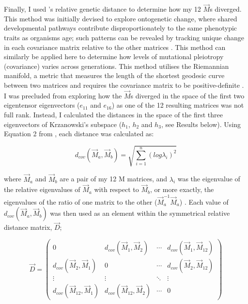 Finally, I used \citet{Mitt09}'s relative genetic distance to determine how my 12 $\vec{M}$s diverged. This method was initially devised to explore ontogenetic change, where shared developmental pathways contribute disproportionately to the same phenotypic traits as organisms age; such patterns can be revealed by tracking unique change in each covariance matrix relative to the other matrices \citep{Mitt09, Book14}. This method can similarly be applied here to determine how levels of mutational pleiotropy (covariance) varies across generations. This method utilises the Riemannian manifold, a metric that measures the length of the shortest geodesic curve between two matrices and requires the covariance matrix to be positive-definite \citep{Mitt09}. I was precluded from exploring how the $\vec{M}$s diverged in the space of the first two eigentensor eigenvectors ($e_{11}$ and $e_{16}$) as one of the 12 resulting matrices was not full rank. Instead, I calculated the distances in the space of the first three eigenvectors of Krzanowski’s subspace ($h_1$, $h_2$ and $h_3$, see Results below). Using Equation 2 from \citet{Mitt09}, each distance was calculated as:\par

\vspace{-\parskip}
\begin{equation}
d_{cov}(\vec{M}_a, \vec{M}_b) = \sqrt{ \sum_{i=1}^{n}(log \lambda_{i})^{2}}  \label{eqn:multi_5_mitte}
\end{equation}

\noindent where $\vec{M}_a$ and $\vec{M}_b$ are a pair of my 12 M matrices, and $\lambda_i$ was the eigenvalue of the relative eigenvalues of $\vec{M}_a$ with respect to $\vec{M}_b$, or more exactly, the eigenvalues of the ratio of one matrix to the other ($\vec{M}_a^{-1}\vec{M}_a$) \citep{Mitt09}. Each value of $d_{cov}(\vec{M}_a, \vec{M}_b)$ was then used as an element within the symmetrical relative distance matrix, $\vec{D}$;\par

\begin{equation}
\vec{D} =
\begin{pmatrix}
0 & d_{cov}(\vec{M}_1, \vec{M}_2) & \cdots & d_{cov}(\vec{M}_1, \vec{M}_{12})\\
d_{cov}(\vec{M}_2, \vec{M}_1) & 0 &  \cdots & d_{cov}(\vec{M}_2, \vec{M}_{12})\\
\vdots  & \vdots  & \ddots & \vdots  \\
d_{cov}(\vec{M}_{12}, \vec{M}_1) & d_{cov}(\vec{M}_{12}, \vec{M}_2) & \cdots  &0
\label{eqn:multi_6_D}
\end{pmatrix}
\end{equation}


